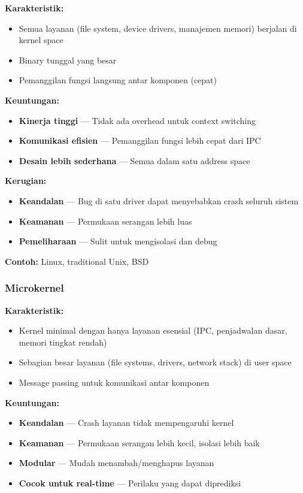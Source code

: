 \textbf{Karakteristik:}
\begin{itemize}
    \item Semua layanan (file system, device drivers, manajemen memori) berjalan di kernel space
    \item Binary tunggal yang besar
    \item Pemanggilan fungsi langsung antar komponen (cepat)
\end{itemize}

\textbf{Keuntungan:}
\begin{itemize}
    \item \textbf{Kinerja tinggi} --- Tidak ada overhead untuk context switching
    \item \textbf{Komunikasi efisien} --- Pemanggilan fungsi lebih cepat dari IPC
    \item \textbf{Desain lebih sederhana} --- Semua dalam satu address space
\end{itemize}

\textbf{Kerugian:}
\begin{itemize}
    \item \textbf{Keandalan} --- Bug di satu driver dapat menyebabkan crash seluruh sistem
    \item \textbf{Keamanan} --- Permukaan serangan lebih luas
    \item \textbf{Pemeliharaan} --- Sulit untuk mengisolasi dan debug
\end{itemize}

\textbf{Contoh:} Linux, traditional Unix, BSD

\subsubsection{Microkernel}

\textbf{Karakteristik:}
\begin{itemize}
    \item Kernel minimal dengan hanya layanan esensial (IPC, penjadwalan dasar, memori tingkat rendah)
    \item Sebagian besar layanan (file systems, drivers, network stack) di user space
    \item Message passing untuk komunikasi antar komponen
\end{itemize}

\textbf{Keuntungan:}
\begin{itemize}
    \item \textbf{Keandalan} --- Crash layanan tidak mempengaruhi kernel
    \item \textbf{Keamanan} --- Permukaan serangan lebih kecil, isolasi lebih baik
    \item \textbf{Modular} --- Mudah menambah/menghapus layanan
    \item \textbf{Cocok untuk real-time} --- Perilaku yang dapat diprediksi
\end{itemize}

